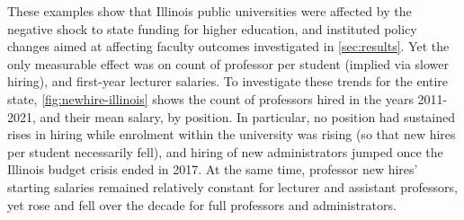 These examples show that Illinois public universities were affected by the negative shock to state funding for higher education, and instituted policy changes aimed at affecting faculty outcomes investigated in \autoref{sec:results}.
Yet the only measurable effect was on count of professor per student (implied via slower hiring), and first-year lecturer salaries.
To investigate these trends for the entire state, \autoref{fig:newhire-illinois} shows the count of professors hired in the years 2011-2021, and their mean salary, by position.
In particular, no position had sustained rises in hiring while enrolment within the university was rising (so that new hires per student necessarily fell), and hiring of new administrators jumped once the Illinois budget crisis ended in 2017.
At the same time, professor new hires' starting salaries remained relatively constant for lecturer and assistant professors, yet rose and fell over the decade for full professors and administrators.
